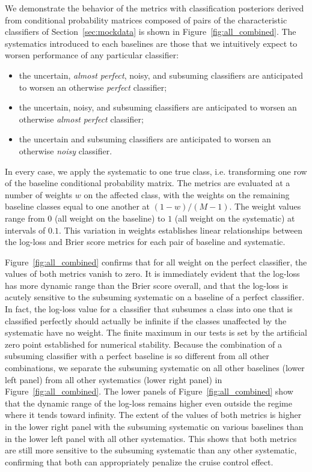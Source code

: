 We demonstrate the behavior of the metrics with classification posteriors derived from conditional probability matrices composed of pairs of the characteristic classifiers of Section~\ref{sec:mockdata} is shown in Figure~\ref{fig:all_combined}.
The systematics introduced to each baselines are those that we intuitively expect to worsen performance of any particular classifier:
\begin{itemize}
\item the uncertain, \textit{almost perfect}, noisy, and subsuming classifiers are anticipated to worsen an otherwise \textit{perfect} classifier;
\item the uncertain, noisy, and subsuming classifiers are anticipated to worsen an otherwise \textit{almost perfect} classifier;
\item the uncertain and subsuming classifiers are anticipated to worsen an otherwise \textit{noisy} classifier.
\end{itemize}
In every case, we apply the systematic to one true class, i.e. transforming one row of the baseline conditional probability matrix.
The metrics are evaluated at a number of weights $w$ on the affected class, with the weights on the remaining baseline classes equal to one another at $(1 - w) / (M - 1)$.
The weight values range from $0$ (all weight on the baseline) to $1$ (all weight on the systematic) at intervals of $0.1$.
This variation in weights establishes linear relationships between the log-loss and Brier score metrics for each pair of baseline and systematic.

Figure~\ref{fig:all_combined} confirms that for all weight on the perfect classifier, the values of both metrics vanish to zero.
It is immediately evident that the log-loss has more dynamic range than the Brier score overall, and that the log-loss is acutely sensitive to the subsuming systematic on a baseline of a perfect classifier.
In fact, the log-loss value for a classifier that subsumes a class into one that is classified perfectly should actually be infinite if the classes unaffected by the systematic have no weight.
The finite maximum in our tests is set by the artificial zero point established for numerical stability.
Because the combination of a subsuming classifier with a perfect baseline is so different from all other combinations, we separate the subsuming systematic on all other baselines (lower left panel) from all other systematics (lower right panel) in Figure~\ref{fig:all_combined}.
The lower panels of Figure~\ref{fig:all_combined} show that the dynamic range of the log-loss remains higher even outside the regime where it tends toward infinity.
The extent of the values of both metrics is higher in the lower right panel with the subsuming systematic on various baselines than in the lower left panel with all other systematics.
This shows that both metrics are still more sensitive to the subsuming systematic than any other systematic, confirming that both can appropriately penalize the cruise control effect.

